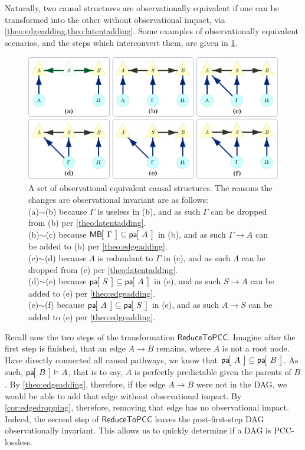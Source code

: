\clearpage
Naturally, two causal structures are observationally equivalent if one can be transformed into the other without observational impact, via \cref{theo:edgeadding,theo:latentadding}. Some examples of observationally equivalent scenarios, and the steps which interconvert them, are given in \cref{fig:equivalences}.
\begin{figure}[b]
\centering
\includegraphics[width=\linewidth]{ObservationalEquivalencesExamples.pdf}
\caption{A set of observational equivalent causal structures. The reasons the changes are observational invariant are as follows: \\
(a)$\sim$(b) because $\Gamma$ is useless in (b), and as such $\Gamma$ can be dropped from (b) per \cref{theo:latentadding}.\\
(b)$\sim$(c) because $\NamedFunction{MB}{\!\Gamma\!}\subseteq\NamedFunction{pa}{\!A\!}$ in (b), and as such $\Gamma\to A$ can be added to (b) per \cref{theo:edgeadding}.\\
(c)$\sim$(d) because $\Lambda$ is redundant to $\Gamma$ in (c), and as such $\Lambda$ can be dropped from (c) per \cref{theo:latentadding}.\\
(d)$\sim$(e) because $\NamedFunction{pa}{\!S\!}\subseteq\NamedFunction{pa}{\!A\!}$ in (e), and as such $S\to A$ can be added to (e) per \cref{theo:edgeadding}.\\
(e)$\sim$(f) because $\NamedFunction{pa}{\!A\!}\subseteq\NamedFunction{pa}{\!S\!}$ in (e), and as such $A\to S$ can be added to (e) per \cref{theo:edgeadding}.
}\label{fig:equivalences}
\end{figure}

Recall now the two steps of the transformation $\mathsf{ReduceToPCC}$. Imagine after the first step is finished, that an edge $A\to B$ remains, where $A$ is not a root node. Have directly connected all causal pathways, we know that $\NamedFunction{pa}{\!A\!}\subseteq\NamedFunction{pa}{\!B\!}$. As such, $\NamedFunction{pa}{\!B\!}\vDash A$, that is to say, $A$ is perfectly predictable given the parents of $B$. By \cref{theo:edgeadding}, therefore, if the edge $A \to B$ were not in the DAG, we would be able to add that edge without observational impact. By \cref{cor:edgedropping}, therefore, removing that edge has no observational impact. Indeed, the second step of $\mathsf{ReduceToPCC}$ leaves the post-first-step DAG observationally invariant. This allows us to quickly determine if a DAG is PCC-lossless.

